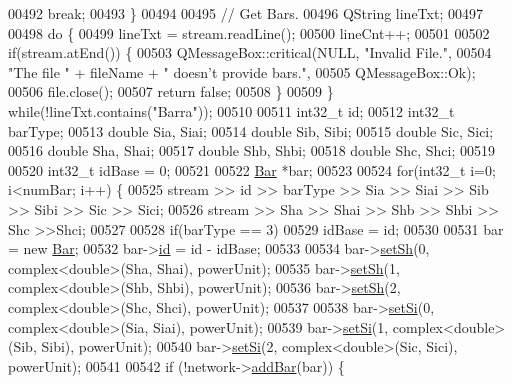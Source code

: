 \begin{DoxyCode}
00492     \textcolor{keywordflow}{break};
00493   \}
00494 
00495   \textcolor{comment}{// Get Bars.}
00496   QString lineTxt;
00497 
00498   \textcolor{keywordflow}{do} \{
00499     lineTxt = stream.readLine();
00500     lineCnt++;
00501 
00502     \textcolor{keywordflow}{if}(stream.atEnd()) \{
00503       QMessageBox::critical(NULL, \textcolor{stringliteral}{"Invalid File."},
00504                             \textcolor{stringliteral}{"The file "} + fileName + \textcolor{stringliteral}{" doesn't provide bars."},
00505                             QMessageBox::Ok);
00506       file.close();
00507       \textcolor{keywordflow}{return} \textcolor{keyword}{false};
00508     \}
00509   \} \textcolor{keywordflow}{while}(!lineTxt.contains(\textcolor{stringliteral}{"Barra"}));
00510 
00511   int32\_t id;
00512   int32\_t barType;
00513   \textcolor{keywordtype}{double} Sia, Siai;
00514   \textcolor{keywordtype}{double} Sib, Sibi;
00515   \textcolor{keywordtype}{double} Sic, Sici;
00516   \textcolor{keywordtype}{double} Sha, Shai;
00517   \textcolor{keywordtype}{double} Shb, Shbi;
00518   \textcolor{keywordtype}{double} Shc, Shci;
00519 
00520   int32\_t idBase = 0;
00521 
00522   \hyperlink{class_bar}{Bar} *bar;
00523 
00524   \textcolor{keywordflow}{for}(int32\_t i=0; i<numBar; i++) \{
00525     stream >> \textcolor{keywordtype}{id} >> barType >> Sia >> Siai >> Sib >> Sibi >> Sic >> Sici;
00526     stream >> Sha >> Shai >> Shb >> Shbi >> Shc >>Shci;
00527 
00528     \textcolor{keywordflow}{if}(barType == 3)
00529       idBase = id;
00530 
00531     bar = \textcolor{keyword}{new} \hyperlink{class_bar}{Bar};
00532     bar->\hyperlink{class_bar_a9dc5c6a6d44fe412ae34ef8a881b8dce}{id} = \textcolor{keywordtype}{id} - idBase;
00533 
00534     bar->\hyperlink{group___models_ga207abd3d0649a488e3c44cf2a501ed23}{setSh}(0, complex<double>(Sha, Shai), powerUnit);
00535     bar->\hyperlink{group___models_ga207abd3d0649a488e3c44cf2a501ed23}{setSh}(1, complex<double>(Shb, Shbi), powerUnit);
00536     bar->\hyperlink{group___models_ga207abd3d0649a488e3c44cf2a501ed23}{setSh}(2, complex<double>(Shc, Shci), powerUnit);
00537 
00538     bar->\hyperlink{group___models_ga74e510be49e50e4c14550b32e1dc92f9}{setSi}(0, complex<double>(Sia, Siai), powerUnit);
00539     bar->\hyperlink{group___models_ga74e510be49e50e4c14550b32e1dc92f9}{setSi}(1, complex<double>(Sib, Sibi), powerUnit);
00540     bar->\hyperlink{group___models_ga74e510be49e50e4c14550b32e1dc92f9}{setSi}(2, complex<double>(Sic, Sici), powerUnit);
00541 
00542     \textcolor{keywordflow}{if} (!network->\hyperlink{group___graphics_ga8c5dfef0216731246f7411e1a5fbee01}{addBar}(bar)) \{

\end{DoxyCode}
